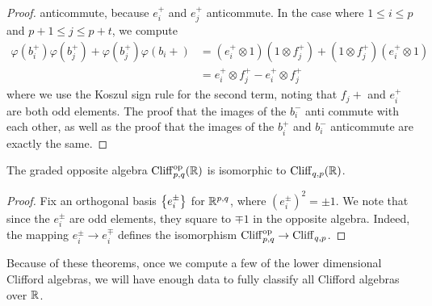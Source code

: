 \begin{proof}
anticommute, because $e_i^+$ and $e_j^+$ anticommute. In the case where
$1 \leq i \leq p$ and $p+1 \leq j \leq p+t$, we compute
%
\begin{align*}
\varphi(b_i^+)\varphi(b_j^+) + \varphi(b_j^+)\varphi(b_i+) &=
(e_i^+ \otimes 1)(1 \otimes f_j^+) + (1\otimes f_j^+)(e_i^+ \otimes 1) \\
&= e_i^+ \otimes f_j^+ - e_i^+ \otimes f_j^+
\end{align*}
where we use the Koszul sign rule for the second term, noting that $f_j+$ and
$e_i^+$ are both odd elements. The proof that the images of the $b_i^-$ anti commute with
each other, as well as the proof that the images of the $b_i^+$ and $b_i^-$
anticommute are exactly the same.
%
\end{proof}
%
\begin{thm}
The graded opposite algebra $\operatorname{Cliff}_{p,q}^{\text{op}}(\mathbb{R})$ is isomorphic to
$\operatorname{Cliff}_{q,p}(\mathbb{R})$.
\end{thm}
%
\begin{proof}
Fix an orthogonal basis $\left\lbrace e_i^\pm \right\rbrace$ for $\mathbb{R}^{p,q}$, where
$(e_i^\pm)^2 = \pm 1$. We note that since the $e_i^\pm$ are odd elements,
they square to $\mp 1$ in the opposite algebra. Indeed, the mapping
$e_i^\pm \to e_i^\mp$ defines the isomorphism
$\operatorname{Cliff}_{p,q}^\text{op} \to \operatorname{Cliff}_{q,p}$.
\end{proof}
%
Because of these theorems, once we compute a few of the lower dimensional
Clifford algebras, we will have enough data to fully classify all Clifford
algebras over $\mathbb{R}$.
%
